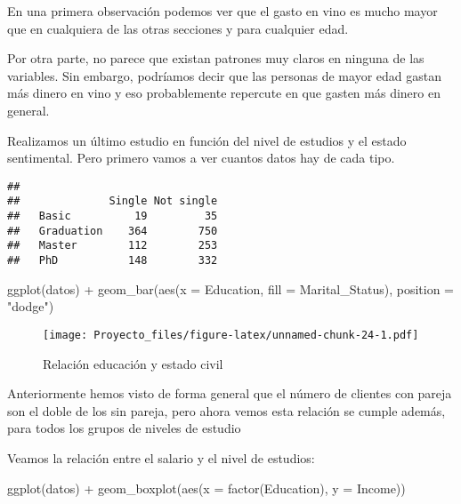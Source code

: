 \documentclass[
]{article}
\newenvironment{Shaded}{\begin{snugshade}}{\end{snugshade}}
\newcommand{\AttributeTok}[1]{\textcolor[rgb]{0.77,0.63,0.00}{#1}}
\newcommand{\FunctionTok}[1]{\textcolor[rgb]{0.00,0.00,0.00}{#1}}
\newcommand{\NormalTok}[1]{#1}
\newcommand{\SpecialCharTok}[1]{\textcolor[rgb]{0.00,0.00,0.00}{#1}}
\newcommand{\StringTok}[1]{\textcolor[rgb]{0.31,0.60,0.02}{#1}}
\begin{document}
En una primera observación podemos ver que el gasto en vino es mucho
mayor que en cualquiera de las otras secciones y para cualquier edad.

Por otra parte, no parece que existan patrones muy claros en ninguna de
las variables. Sin embargo, podríamos decir que las personas de mayor
edad gastan más dinero en vino y eso probablemente repercute en que
gasten más dinero en general.

Realizamos un último estudio en función del nivel de estudios y el
estado sentimental. Pero primero vamos a ver cuantos datos hay de cada
tipo.

\begin{Shaded}
\end{Shaded}

\begin{verbatim}
##             
##              Single Not single
##   Basic          19         35
##   Graduation    364        750
##   Master        112        253
##   PhD           148        332
\end{verbatim}

\begin{Shaded}
\begin{Highlighting}[]
\FunctionTok{ggplot}\NormalTok{(datos) }\SpecialCharTok{+}
  \FunctionTok{geom\_bar}\NormalTok{(}\FunctionTok{aes}\NormalTok{(}\AttributeTok{x =}\NormalTok{ Education, }\AttributeTok{fill =}\NormalTok{ Marital\_Status), }\AttributeTok{position =} \StringTok{"dodge"}\NormalTok{)}
\end{Highlighting}
\end{Shaded}

\begin{figure}
\centering
\texttt{[image: Proyecto\_files/figure-latex/unnamed-chunk-24-1.pdf]}
\caption{Relación educación y estado civil}
\end{figure}

Anteriormente hemos visto de forma general que el número de clientes con
pareja son el doble de los sin pareja, pero ahora vemos esta relación se
cumple además, para todos los grupos de niveles de estudio

Veamos la relación entre el salario y el nivel de estudios:

\begin{Shaded}
\begin{Highlighting}[]
\FunctionTok{ggplot}\NormalTok{(datos) }\SpecialCharTok{+}
  \FunctionTok{geom\_boxplot}\NormalTok{(}\FunctionTok{aes}\NormalTok{(}\AttributeTok{x =} \FunctionTok{factor}\NormalTok{(Education), }\AttributeTok{y =}\NormalTok{ Income))}
\end{Highlighting}
\end{Shaded}
\end{document}

